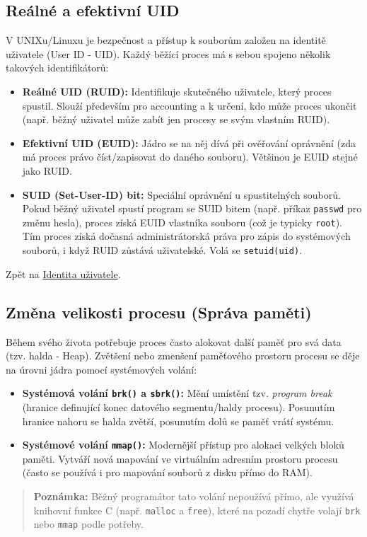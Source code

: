 \subsection{Reálné a efektivní UID}
\label{sub:UID}
V UNIXu/Linuxu je bezpečnost a přístup k souborům založen na identitě uživatele (User ID - UID). Každý běžící proces má s sebou spojeno několik takových identifikátorů:
\begin{itemize}
    \item \textbf{Reálné UID (RUID):} Identifikuje skutečného uživatele, který proces spustil. Slouží především pro accounting a k určení, kdo může proces ukončit (např. běžný uživatel může zabít jen procesy se svým vlastním RUID).
    \item \textbf{Efektivní UID (EUID):} Jádro se na něj dívá při ověřování oprávnění (zda má proces právo číst/zapisovat do daného souboru). Většinou je EUID stejné jako RUID.
    \item \textbf{SUID (Set-User-ID) bit:} Speciální oprávnění u spustitelných souborů. Pokud běžný uživatel spustí program se SUID bitem (např. příkaz \texttt{passwd} pro změnu hesla), proces získá EUID vlastníka souboru (což je typicky \texttt{root}). Tím proces získá dočasná administrátorská práva pro zápis do systémových souborů, i když RUID zůstává uživatelské.
    Volá se \texttt{setuid(uid)}.
\end{itemize}
Zpět na \hyperref[sub:identita]{Identita uživatele}.

\subsection{Změna velikosti procesu (Správa paměti)}
Během svého života potřebuje proces často alokovat další paměť pro svá data (tzv. halda - Heap). Zvětšení nebo zmenšení paměťového prostoru procesu se děje na úrovni jádra pomocí systémových volání:
\begin{itemize}
    \item \textbf{Systémová volání \texttt{brk()} a \texttt{sbrk()}:} Mění umístění tzv. \textit{program break} (hranice definující konec datového segmentu/haldy procesu). Posunutím hranice nahoru se halda zvětší, posunutím dolů se paměť vrátí systému.
    \item \textbf{Systémové volání \texttt{mmap()}:} Modernější přístup pro alokaci velkých bloků paměti. Vytváří nová mapování ve virtuálním adresním prostoru procesu (často se používá i pro mapování souborů z disku přímo do RAM).
\end{itemize}
\begin{quote}
        \textbf{Poznámka:} Běžný programátor tato volání nepoužívá přímo, ale využívá knihovní funkce C (např. \texttt{malloc} a \texttt{free}), které na pozadí chytře volají \texttt{brk} nebo \texttt{mmap} podle potřeby.
\end{quote}
